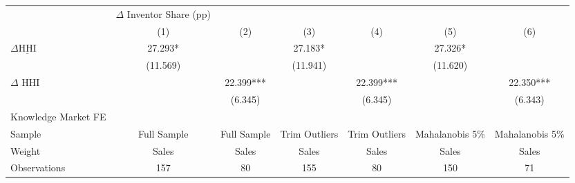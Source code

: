 {
\def\sym#1{\ifmmode^{#1}\else\(^{#1}\)\fi}
\begin{tabular}{l*{6}{c}}
\hline\hline
                    &$\Delta$ Inventor Share (pp)   &               &               &               &               &               \\
                    &\multicolumn{1}{c}{(1)}   &\multicolumn{1}{c}{(2)}   &\multicolumn{1}{c}{(3)}   &\multicolumn{1}{c}{(4)}   &\multicolumn{1}{c}{(5)}   &\multicolumn{1}{c}{(6)}   \\
\hline
$\Delta \underline{\text{HHI}}$&      27.293*  &               &      27.183*  &               &      27.326*  &               \\
                    &    (11.569)   &               &    (11.941)   &               &    (11.620)   &               \\
$\Delta$ HHI        &               &      22.399***&               &      22.399***&               &      22.350***\\
                    &               &     (6.345)   &               &     (6.345)   &               &     (6.343)   \\
\hline
Knowledge Market FE &               &               &               &               &               &               \\
Sample              & Full Sample   & Full Sample   &Trim Outliers   &Trim Outliers   &Mahalanobis 5\%   &Mahalanobis 5\%   \\
Weight              &       Sales   &       Sales   &       Sales   &       Sales   &       Sales   &       Sales   \\
Observations        &         157   &          80   &         155   &          80   &         150   &          71   \\
\hline\hline
\end{tabular}
}
